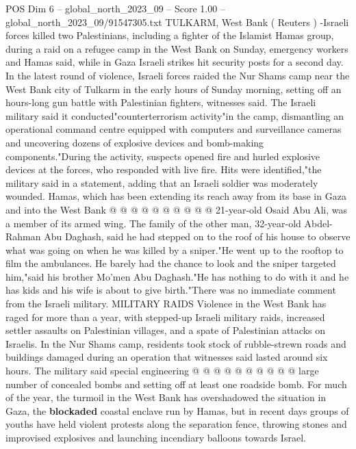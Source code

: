 \begin{textsample}{POS Dim 6 – global\_north\_2023\_09 – Score 1.00 – global\_north\_2023\_09/91547305.txt}  \label{ex:f6_pos_080}
TULKARM, West Bank ( Reuters ) -Israeli forces killed two Palestinians, including a fighter of the Islamist Hamas group, during a raid on a refugee camp in the West Bank on Sunday, emergency workers and Hamas said, while in Gaza Israeli strikes hit security posts for a second day.
In the latest round of violence, Israeli forces raided the Nur Shams camp near the West Bank city of Tulkarm in the early hours of Sunday morning, setting off an hours-long gun battle with Palestinian fighters, witnesses said.
The Israeli military said it conducted"counterterrorism activity"in the camp, dismantling an operational command centre equipped with computers and surveillance cameras and uncovering dozens of explosive devices and bomb-making components."During the activity, suspects opened fire and hurled explosive devices at the forces, who responded with live fire.
Hits were identified,"the military said in a statement, adding that an Israeli soldier was moderately wounded.
Hamas, which has been extending its reach away from its base in Gaza and into the West Bank @ @ @ @ @ @ @ @ @ @ 21-year-old Osaid Abu Ali, was a member of its armed wing.
The family of the other man, 32-year-old Abdel-Rahman Abu Daghash, said he had stepped on to the roof of his house to observe what was going on when he was killed by a sniper."He went up to the rooftop to film the ambulances.
He barely had the chance to look and the sniper targeted him,"said his brother Mo'men Abu Daghash."He has nothing to do with it and he has kids and his wife is about to give birth."There was no immediate comment from the Israeli military.
MILITARY RAIDS Violence in the West Bank has raged for more than a year, with stepped-up Israeli military raids, increased settler assaults on Palestinian villages, and a spate of Palestinian attacks on Israelis.
In the Nur Shams camp, residents took stock of rubble-strewn roads and buildings damaged during an operation that witnesses said lasted around six hours.
The military said special engineering @ @ @ @ @ @ @ @ @ @ large number of concealed bombs and setting off at least one roadside bomb.
For much of the year, the turmoil in the West Bank has overshadowed the situation in Gaza, the \textbf{blockaded} coastal enclave run by Hamas, but in recent days groups of youths have held violent protests along the separation fence, throwing stones and improvised explosives and launching incendiary balloons towards Israel.

\end{textsample}
